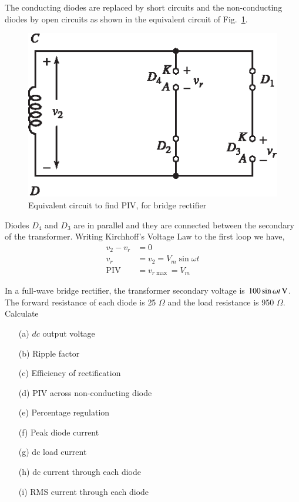 The conducting diodes are replaced by short circuits and the non-conducting diodes by open circuits as shown in the equivalent circuit of Fig.~\ref{fig2.11}.
\begin{figure}[H]
\centering
\includegraphics{chap2/add-fig/S3-EE-02-011.eps}
\caption{Equivalent circuit to find PIV, for bridge rectifier}\label{fig2.11}
\end{figure}

Diodes $D_4$ and $D_3$ are in parallel and they are connected between
the secondary of the transformer. Writing Kirchhoff's Voltage Law to
the first loop we have,
\begin{align*}
v_2 - v_r & = 0\\
v_r & = v_2 = V_m \sin \omega t\\
\text{PIV } & = v_{r \max} = V_m
\end{align*}

\begin{example}\label{exam2.12}
In a full-wave bridge rectifier, the transformer secondary voltage is
$100 \sin \omega t \operatorname{\mathrm{V}}$. The forward resistance of each diode is 25
$\Omega$ and the load resistance is 950 $\Omega$. Calculate
\begin{itemize}
\itemsep=1pt
\item[(a)] $dc$ output voltage

\item[(b)] Ripple factor

\item[(c)] Efficiency of rectification

\item[(d)] PIV across non-conducting diode 

\item[(e)] Percentage regulation

\item[(f)] Peak diode current

\item[(g)] dc load current

\item[(h)] dc current through each diode

\item[(i)] RMS current through each diode
\end{itemize}
\end{example}

